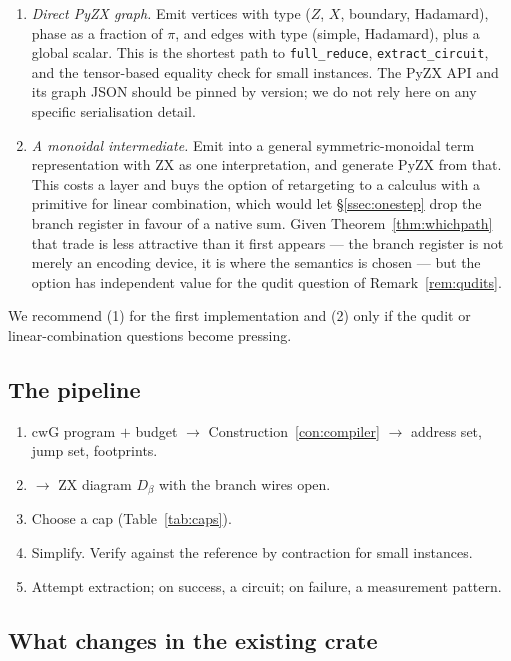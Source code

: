 \documentclass[11pt]{article}
\theoremstyle{definition}
\theoremstyle{plain}
\newcommand{\cwG}{\mathrm{cwG}}
\begin{document}
\begin{enumerate}[leftmargin=*]
  \item \emph{Direct PyZX graph.} Emit vertices with type ($Z$, $X$, boundary, Hadamard), phase
        as a fraction of $\pi$, and edges with type (simple, Hadamard), plus a global scalar.
        This is the shortest path to \texttt{full\_reduce}, \texttt{extract\_circuit}, and the
        tensor-based equality check for small instances. The PyZX API and its graph JSON should be
        pinned by version; we do not rely here on any specific serialisation detail.
  \item \emph{A monoidal intermediate.} Emit into a general symmetric-monoidal term
        representation with ZX as one interpretation, and generate PyZX from that. This costs a
        layer and buys the option of retargeting to a calculus with a primitive for linear
        combination, which would let \S\ref{ssec:onestep} drop the branch register in favour of a
        native sum. Given Theorem~\ref{thm:whichpath} that trade is less attractive than it first
        appears --- the branch register is not merely an encoding device, it is where the
        semantics is chosen --- but the option has independent value for the qudit question of
        Remark~\ref{rem:qudits}.
\end{enumerate}

We recommend (1) for the first implementation and (2) only if the qudit or linear-combination
questions become pressing.

\subsection{The pipeline}

\begin{enumerate}[leftmargin=*]
  \item $\cwG$ program $+$ budget $\longrightarrow$ Construction~\ref{con:compiler}
        $\longrightarrow$ address set, jump set, footprints.
  \item $\longrightarrow$ ZX diagram $D_\beta$ with the branch wires open.
  \item Choose a cap (Table~\ref{tab:caps}).
  \item Simplify. Verify against the reference by contraction for small instances.
  \item Attempt extraction; on success, a circuit; on failure, a measurement pattern.
\end{enumerate}

\subsection{What changes in the existing crate}
\end{document}
